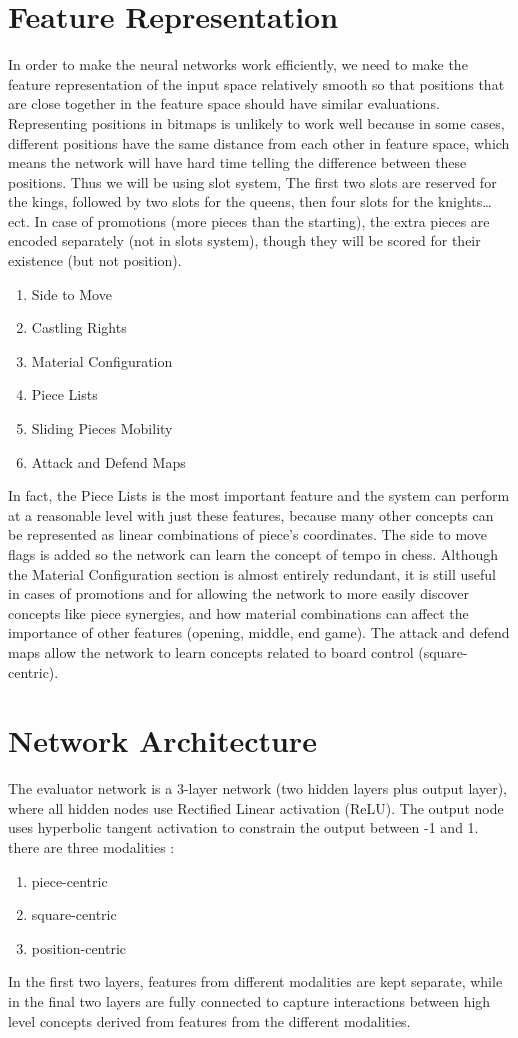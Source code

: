 \documentclass[12pt, a4paper]{report}
\begin{document}
		\section{Feature Representation}
			In order to make the neural networks work efficiently, we need to make the feature representation of the input space relatively smooth so that positions that are close together in the feature space should have similar evaluations.
			Representing positions in bitmaps is unlikely to work well because in some cases, different positions have the same distance from each other in feature space, which means the network will have hard time telling the difference between these positions.
			Thus we will be using slot system, The first two slots are reserved for the kings, followed by two slots for the queens, then four slots for the knights…ect.
			In case of promotions (more pieces than the starting), the extra pieces are encoded separately (not in slots system), though they will be scored for their existence (but not position).
			\begin{enumerate}
				\item Side to Move
				\item Castling Rights
				\item Material Configuration
				\item Piece Lists
				\item Sliding Pieces Mobility
				\item Attack and Defend Maps
			\end{enumerate}
			In fact, the Piece Lists is the most important feature and the system can perform at a reasonable level with just these features, because many other concepts can be represented as linear combinations of piece’s coordinates.
			The side to move flags is added so the network can learn the concept of tempo in chess.
			Although the Material Configuration section is almost entirely redundant, it is still useful in cases of promotions and for allowing the network to more easily discover concepts like piece synergies, and how material combinations can affect the importance of other features (opening, middle, end game).
			The attack and defend maps allow the network to learn concepts related to board control (square-centric).

		\section{Network Architecture}
			The evaluator network is a 3-layer network (two hidden layers plus output layer), where all hidden nodes use Rectified Linear activation (ReLU).
			The output node uses hyperbolic tangent activation to constrain the output between -1 and 1.
			there are three modalities :
			\begin{enumerate}
				\item piece-centric 
				\item square-centric
				\item position-centric
			\end{enumerate}
			In the first two layers, features from different modalities are kept separate, while in the final two layers are fully connected to capture interactions between high level concepts derived from features from the different modalities.
\end{document}
